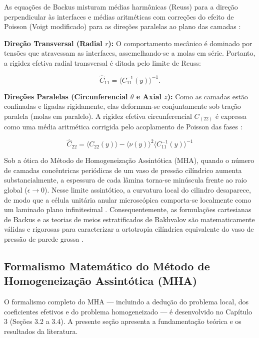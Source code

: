 As equações de Backus misturam médias harmônicas (Reuss) para a direção perpendicular às interfaces e médias aritméticas com correções do efeito de Poisson (Voigt modificado) para as direções paralelas ao plano das camadas \cite{Backus1962}:

\textbf{Direção Transversal (Radial $r$):} O comportamento mecânico é dominado por tensões que atravessam as interfaces, assemelhando-se a molas em série. Portanto, a rigidez efetiva radial transversal é ditada pelo limite de Reuss:

\begin{equation}
    \hat{C}_{11} = \langle C_{11}^{-1}(y) \rangle^{-1} .
\end{equation} \label{eq:backus_c11}

\textbf{Direções Paralelas (Circunferencial $\theta$ e Axial $z$):} Como as camadas estão confinadas e ligadas rigidamente, elas deformam-se conjuntamente sob tração paralela (molas em paralelo). A rigidez efetiva circunferencial $C_(22)$ é expressa como uma média aritmética corrigida pelo acoplamento de Poisson das fases \cite{Backus1962}:

\begin{equation}
\hat{C}_{22} = \langle C_{22}(y) \rangle - \langle \nu(y) \rangle^2 \langle C_{11}^{-1}(y) \rangle^{-1}
  \label{eq:backus_c22}
\end{equation}

Sob a ótica do Método de Homogeneização Assintótica (MHA), quando o número de camadas concêntricas periódicas de um vaso de pressão cilíndrico aumenta substancialmente, a espessura de cada lâmina torna-se minúscula frente ao raio global ($\epsilon \to 0$). Nesse limite assintótico, a curvatura local do cilindro desaparece, de modo que a célula unitária anular microscópica comporta-se localmente como um laminado plano infinitesimal \cite{bakhvalov1989}. Consequentemente, as formulações cartesianas de Backus e as teorias de meios estratificados de Bakhvalov são matematicamente válidas e rigorosas para caracterizar a ortotropia cilíndrica equivalente do vaso de pressão de parede grossa \cite{bakhvalov1989}.

\subsection{Formalismo Matemático do Método de Homogeneização Assintótica (MHA)}

O formalismo completo do MHA — incluindo a dedução do problema local, dos coeficientes efetivos e do problema homogeneizado — é desenvolvido no Capítulo 3 (Seções 3.2 a 3.4). A presente seção apresenta a fundamentação teórica e os resultados da literatura.

